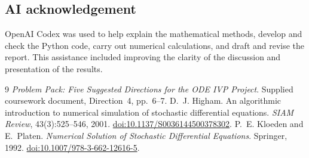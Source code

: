 \documentclass[11pt,a4paper]{article}
\begin{document}
\subsection*{AI acknowledgement}
OpenAI Codex was used to help explain the mathematical methods, develop and check the Python code, carry out numerical calculations, and draft and revise the report. This assistance included improving the clarity of the discussion and presentation of the results.

\begin{thebibliography}{9}
 \emph{Problem Pack: Five Suggested Directions for the ODE IVP Project}.
Supplied coursework document, Direction~4, pp.~6--7.
 D.~J. Higham. An algorithmic introduction to numerical simulation of stochastic differential equations. \emph{SIAM Review}, 43(3):525--546, 2001.
\href{https://doi.org/10.1137/S0036144500378302}{doi:10.1137/S0036144500378302}.
 P.~E. Kloeden and E.~Platen. \emph{Numerical Solution of Stochastic Differential Equations}. Springer, 1992.
\href{https://doi.org/10.1007/978-3-662-12616-5}{doi:10.1007/978-3-662-12616-5}.
\end{thebibliography}

\newpage
\appendix
\end{document}
